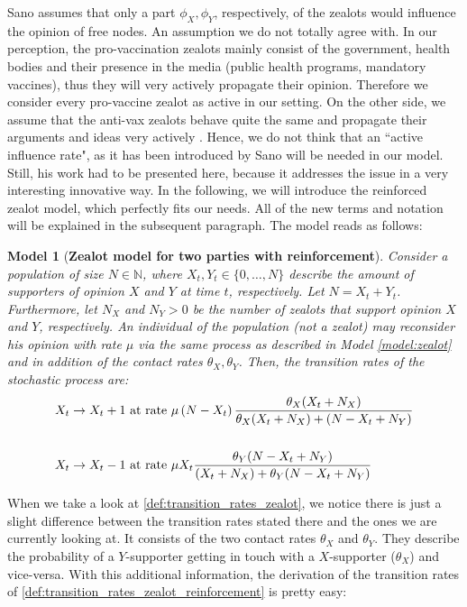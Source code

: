 \documentclass[12pt,a4paper,twoside]{article}
\newtheorem{model}{Model}[section]
\begin{document}
Sano assumes that only a part $\phi_X, \phi_Y$, respectively, of the zealots would influence the opinion of free nodes. An assumption we do not totally agree with. In our perception, the pro-vaccination zealots mainly consist of the government, health bodies and their presence in the media (public health programs, mandatory vaccines), thus they will very actively propagate their opinion. Therefore we consider every pro-vaccine zealot as active in our setting. On the other side, we assume that the anti-vax zealots behave quite the same and propagate their arguments and ideas very actively \cite{Davies2002, Meyer2004}. Hence, we do not think that an ``active influence rate", as it has been introduced by Sano will be needed in our model. Still, his work had to be presented here, because it addresses the issue in a very interesting innovative way. In the following, we will introduce the reinforced zealot model, which perfectly fits our needs. All of the new terms and notation will be explained in the subsequent paragraph. The model reads as follows:
\begin{model}[\textbf{Zealot model for two parties with reinforcement}]\label{model:zealot_reinforcement}%
	Consider a population of size $N \in \mathbb{N}$, where $X_t, Y_t \in \lbrace 0,\dots, N\rbrace$ describe the amount of supporters of opinion $X$ and $Y$ at time $t$, respectively. Let $N = X_t + Y_t$. Furthermore, let $N_X$ and $N_Y > 0$ be the number of zealots that support opinion $X$ and $Y$, respectively. An individual of the population (not a zealot) may reconsider his opinion with rate $\mu$ via the same process as described in Model \ref{model:zealot} and in addition of the contact rates $\theta_X, \theta_Y$. Then, the transition rates of the stochastic process are:
	\begin{align}\label{def:transition_rates_zealot_reinforcement}
	\begin{split}
	X_t \rightarrow X_t + 1 & \textnormal{ at rate } \mu\left(N-X_t\right)\frac{\theta_X (X_t + N_X)}{\theta_X (X_t + N_X) + (N - X_t + N_Y)} \\
	&\\
	X_t \rightarrow X_t - 1 & \textnormal{ at rate } \mu X_t\frac{\theta_Y(N-X_t+N_Y)}{(X_t + N_X) + \theta_Y(N-X_t+N_Y)}
	\end{split}
	\end{align}
\end{model}

When we take a look at \eqref{def:transition_rates_zealot}, we notice there is just a slight difference between the transition rates stated there and the ones we are currently looking at. It consists of the two contact rates $\theta_X$ and $\theta_Y$. They describe the probability of a $Y$-supporter getting in touch with a $X$-supporter ($\theta_X$) and vice-versa. With this additional information, the derivation of the transition rates of \eqref{def:transition_rates_zealot_reinforcement} is pretty easy:\newline
\end{document}
